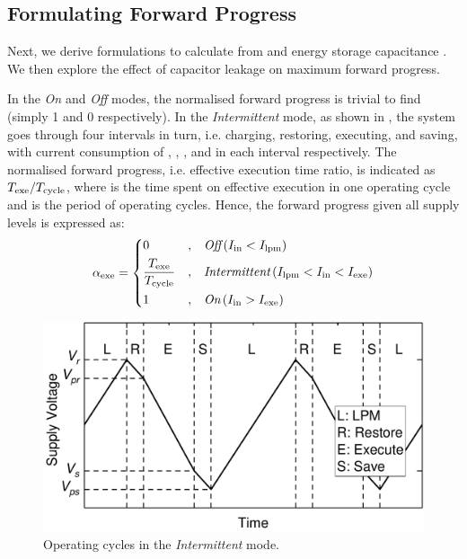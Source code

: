 \subsection{Formulating Forward Progress} \label{subsec:formulation}

Next, we derive formulations to calculate  from  and energy storage capacitance . We then explore the effect of capacitor leakage on maximum forward progress. 

In the \textit{On} and \textit{Off} modes, the normalised forward progress is trivial to find (simply 1 and 0 respectively). In the \textit{Intermittent} mode,  as shown in , the system goes through four intervals in turn, i.e. charging, restoring, executing, and saving, with current consumption of , , , and  in each interval respectively. The normalised forward progress, i.e. effective execution time ratio, is indicated as $T_{\text{exe}} / T_{\text{cycle}}$, where  is the time spent on effective execution in one operating cycle and  is the period of operating cycles. Hence, the forward progress given all supply levels is expressed as:
\begin{equation}
    \alpha_{\text{exe}} = \left\{
    \begin{aligned}
        & 0 & , & \quad \textit{Off} \, (I_{\text{in}} < I_{\text{lpm}}) \\
        & \frac{T_{\text{exe}}}{T_{\text{cycle}}} & , & \quad \textit{Intermittent} \, (I_{\text{lpm}} < I_{\text{in}} < I_{\text{exe}}) \\
        & 1 & , & \quad \textit{On} \, (I_{\text{in}} > I_{\text{exe}})
    \end{aligned}
    \right.
    \label{eq:feff}
\end{equation}

\begin{figure}[!t]
    \centering
    \includegraphics[width=0.8\columnwidth]{ch3_sizingeffect/figures/CRESdemoFig}
    \caption{Operating cycles in the \textit{Intermittent} mode. }
    \label{fig:operatingCycle}
\end{figure}

